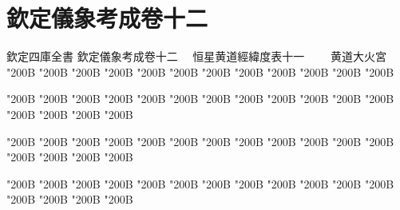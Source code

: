 \chapter*{欽定儀象考成卷十二}
\begin{正文}
欽定四庫全書
欽定儀象考成卷十二
　恒星黄道經緯度表十一
　　黄道大火宮
\char"200B\relax{}
\char"200B\relax{}
\char"200B\relax{}
\char"200B\relax{}
\char"200B\relax{}
\char"200B\relax{}
\char"200B\relax{}
\char"200B\relax{}
\char"200B\relax{}
\char"200B\relax{}
\char"200B\relax{}
\char"200B\relax
\par
\end{正文}\clearpage
{}
\begin{正文}
\char"200B\relax{}
\char"200B\relax{}
\char"200B\relax{}
\char"200B\relax{}
\char"200B\relax{}
\char"200B\relax{}
\char"200B\relax{}
\char"200B\relax{}
\char"200B\relax{}
\char"200B\relax{}
\char"200B\relax{}
\char"200B\relax{}
\char"200B\relax{}
\char"200B\relax{}
\char"200B\relax{}
\char"200B\relax
{}\par
\end{正文}\clearpage
{}
\begin{正文}
\char"200B\relax{}
\char"200B\relax{}
\char"200B\relax{}
\char"200B\relax{}
\char"200B\relax{}
\char"200B\relax{}
\char"200B\relax{}
\char"200B\relax{}
\char"200B\relax{}
\char"200B\relax{}
\char"200B\relax{}
\char"200B\relax{}
\char"200B\relax{}
\char"200B\relax{}
\char"200B\relax{}
\char"200B\relax
{}\par
\end{正文}\clearpage
{}
\begin{正文}
\char"200B\relax{}
\char"200B\relax{}
\char"200B\relax{}
\char"200B\relax{}
\char"200B\relax{}
\char"200B\relax{}
\char"200B\relax{}
\char"200B\relax{}
\char"200B\relax{}
\char"200B\relax{}
\char"200B\relax{}
\char"200B\relax{}
\char"200B\relax{}
\char"200B\relax{}
\char"200B\relax{}
\char"200B\relax
{}\par
\end{正文}\clearpage
